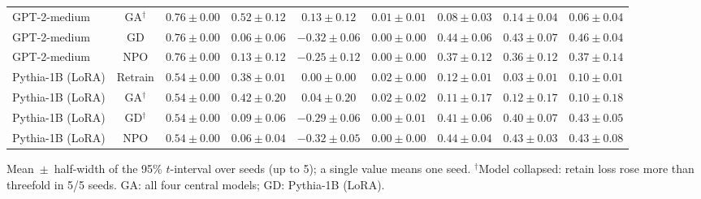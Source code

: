 \begin{table}[t]
\begin{tabular*}{\textwidth}{@{\extracolsep{\fill}}lcccccccc@{}}
GPT-2-medium & GA$^{\dagger}$ & $0.76 \pm 0.00$ & $0.52 \pm 0.12$ & $0.13 \pm 0.12$ & $0.01 \pm 0.01$ & $0.08 \pm 0.03$ & $0.14 \pm 0.04$ & $0.06 \pm 0.04$ \\
GPT-2-medium & GD & $0.76 \pm 0.00$ & $0.06 \pm 0.06$ & $-0.32 \pm 0.06$ & $0.00 \pm 0.00$ & $0.44 \pm 0.06$ & $0.43 \pm 0.07$ & $0.46 \pm 0.04$ \\
GPT-2-medium & NPO & $0.76 \pm 0.00$ & $0.13 \pm 0.12$ & $-0.25 \pm 0.12$ & $0.00 \pm 0.00$ & $0.37 \pm 0.12$ & $0.36 \pm 0.12$ & $0.37 \pm 0.14$ \\
Pythia-1B (LoRA) & Retrain & $0.54 \pm 0.00$ & $0.38 \pm 0.01$ & $0.00 \pm 0.00$ & $0.02 \pm 0.00$ & $0.12 \pm 0.01$ & $0.03 \pm 0.01$ & $0.10 \pm 0.01$ \\
Pythia-1B (LoRA) & GA$^{\dagger}$ & $0.54 \pm 0.00$ & $0.42 \pm 0.20$ & $0.04 \pm 0.20$ & $0.02 \pm 0.02$ & $0.11 \pm 0.17$ & $0.12 \pm 0.17$ & $0.10 \pm 0.18$ \\
Pythia-1B (LoRA) & GD$^{\dagger}$ & $0.54 \pm 0.00$ & $0.09 \pm 0.06$ & $-0.29 \pm 0.06$ & $0.00 \pm 0.01$ & $0.41 \pm 0.06$ & $0.40 \pm 0.07$ & $0.43 \pm 0.05$ \\
Pythia-1B (LoRA) & NPO & $0.54 \pm 0.00$ & $0.06 \pm 0.04$ & $-0.32 \pm 0.05$ & $0.00 \pm 0.00$ & $0.44 \pm 0.04$ & $0.43 \pm 0.03$ & $0.43 \pm 0.08$ \\
\bottomrule
\end{tabular*}

\smallskip
{\footnotesize Mean~$\pm$~half-width of the 95\% $t$-interval over seeds (up to 5); a single value means one seed. $^{\dagger}$Model collapsed: retain loss rose more than threefold in 5/5 seeds. GA: all four central models; GD: Pythia-1B (LoRA).\par}
\end{table}
